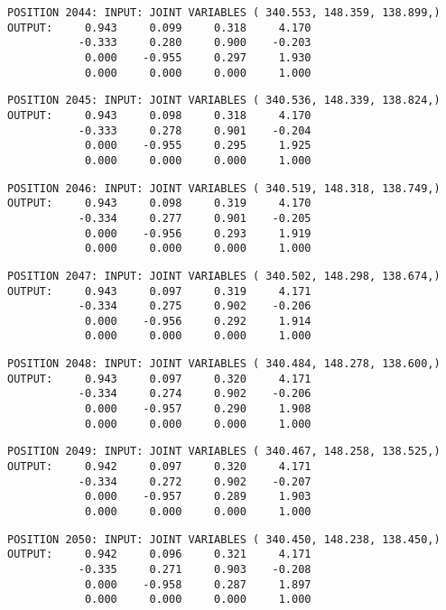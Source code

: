 \begin{verbatim}
POSITION 2044: INPUT: JOINT VARIABLES ( 340.553, 148.359, 138.899,)
OUTPUT:     0.943     0.099     0.318     4.170
           -0.333     0.280     0.900    -0.203
            0.000    -0.955     0.297     1.930
            0.000     0.000     0.000     1.000
\end{verbatim} \pagebreak[1]\begin{verbatim}
POSITION 2045: INPUT: JOINT VARIABLES ( 340.536, 148.339, 138.824,)
OUTPUT:     0.943     0.098     0.318     4.170
           -0.333     0.278     0.901    -0.204
            0.000    -0.955     0.295     1.925
            0.000     0.000     0.000     1.000
\end{verbatim} \pagebreak[1]\begin{verbatim}
POSITION 2046: INPUT: JOINT VARIABLES ( 340.519, 148.318, 138.749,)
OUTPUT:     0.943     0.098     0.319     4.170
           -0.334     0.277     0.901    -0.205
            0.000    -0.956     0.293     1.919
            0.000     0.000     0.000     1.000
\end{verbatim} \pagebreak[1]\begin{verbatim}
POSITION 2047: INPUT: JOINT VARIABLES ( 340.502, 148.298, 138.674,)
OUTPUT:     0.943     0.097     0.319     4.171
           -0.334     0.275     0.902    -0.206
            0.000    -0.956     0.292     1.914
            0.000     0.000     0.000     1.000
\end{verbatim} \pagebreak[1]\begin{verbatim}
POSITION 2048: INPUT: JOINT VARIABLES ( 340.484, 148.278, 138.600,)
OUTPUT:     0.943     0.097     0.320     4.171
           -0.334     0.274     0.902    -0.206
            0.000    -0.957     0.290     1.908
            0.000     0.000     0.000     1.000
\end{verbatim} \pagebreak[1]\begin{verbatim}
POSITION 2049: INPUT: JOINT VARIABLES ( 340.467, 148.258, 138.525,)
OUTPUT:     0.942     0.097     0.320     4.171
           -0.334     0.272     0.902    -0.207
            0.000    -0.957     0.289     1.903
            0.000     0.000     0.000     1.000
\end{verbatim} \pagebreak[1]\begin{verbatim}
POSITION 2050: INPUT: JOINT VARIABLES ( 340.450, 148.238, 138.450,)
OUTPUT:     0.942     0.096     0.321     4.171
           -0.335     0.271     0.903    -0.208
            0.000    -0.958     0.287     1.897
            0.000     0.000     0.000     1.000
\end{verbatim} \pagebreak[1]\begin{verbatim}

\end{verbatim}

